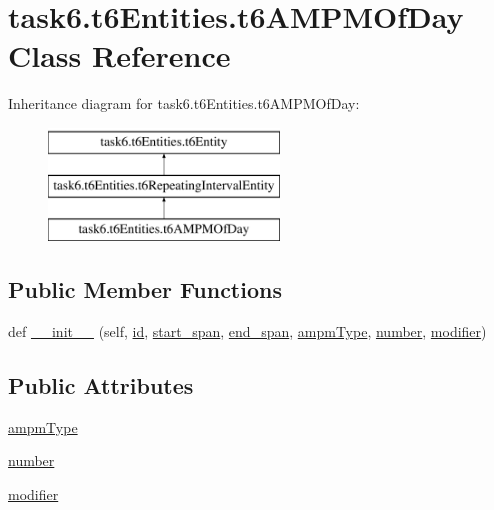 \hypertarget{classtask6_1_1t6Entities_1_1t6AMPMOfDay}{}\section{task6.\+t6\+Entities.\+t6\+A\+M\+P\+M\+Of\+Day Class Reference}
\label{classtask6_1_1t6Entities_1_1t6AMPMOfDay}
Inheritance diagram for task6.\+t6\+Entities.\+t6\+A\+M\+P\+M\+Of\+Day\+:\begin{figure}[H]
\begin{center}
\leavevmode
\includegraphics[height=3.000000cm]{classtask6_1_1t6Entities_1_1t6AMPMOfDay}
\end{center}
\end{figure}
\subsection*{Public Member Functions}
\begin{DoxyCompactItemize}
\item 
def \hyperlink{classtask6_1_1t6Entities_1_1t6AMPMOfDay_a1c76a35724907be72e663d23e7028575}{\+\_\+\+\_\+init\+\_\+\+\_\+} (self, \hyperlink{classtask6_1_1t6Entities_1_1t6Entity_a96b2e7fb553c920ab2db6f6deb31e3b4}{id}, \hyperlink{classtask6_1_1t6Entities_1_1t6Entity_a8221c36d2995a24200cdfbd74cc9233c}{start\+\_\+span}, \hyperlink{classtask6_1_1t6Entities_1_1t6Entity_a597d42bb02fc9f42277098f0ce21917c}{end\+\_\+span}, \hyperlink{classtask6_1_1t6Entities_1_1t6AMPMOfDay_adc829f7c35873d5af0cad12e8204b1fb}{ampm\+Type}, \hyperlink{classtask6_1_1t6Entities_1_1t6AMPMOfDay_a99678a4e401421ec921e417fd960f9e8}{number}, \hyperlink{classtask6_1_1t6Entities_1_1t6AMPMOfDay_af7d283b12c4c96aa7e01782436dda882}{modifier})
\end{DoxyCompactItemize}
\subsection*{Public Attributes}
\begin{DoxyCompactItemize}
\item 
\hyperlink{classtask6_1_1t6Entities_1_1t6AMPMOfDay_adc829f7c35873d5af0cad12e8204b1fb}{ampm\+Type}
\item 
\hyperlink{classtask6_1_1t6Entities_1_1t6AMPMOfDay_a99678a4e401421ec921e417fd960f9e8}{number}
\item 
\hyperlink{classtask6_1_1t6Entities_1_1t6AMPMOfDay_af7d283b12c4c96aa7e01782436dda882}{modifier}
\end{DoxyCompactItemize}


